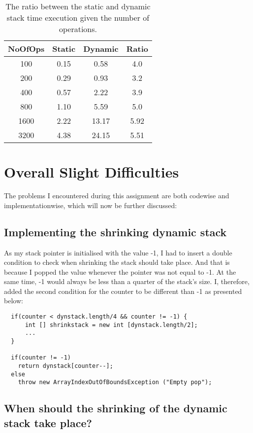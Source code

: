 \documentclass[a4paper,11pt]{article}
\begin{document}
  \begin{table}[h!]
    \centering
     \begin{tabular}{||c c c c||} 
     \hline
     NoOfOps & Static & Dynamic & Ratio \\ [0.5ex] 
     \hline\hline
     100 & 0.15 & 0.58 & 4.0 \\ 
     200 & 0.29 & 0.93 & 3.2 \\
     400 & 0.57 & 2.22 & 3.9 \\
     800 & 1.10 & 5.59 & 5.0 \\
     1600 & 2.22 & 13.17 & 5.92\\ 
     3200 & 4.38 & 24.15 & 5.51\\ [1ex] 
     \hline
     \end{tabular}
     \caption{The ratio between the static and dynamic stack time execution given the number of operations.}
     \label{table:1}
    \end{table}

\section*{Overall Slight Difficulties}

The problems I encountered during this assignment are both codewise and implementationwise, which will now be further discussed: 

\subsection* {Implementing the shrinking dynamic stack}
As my stack pointer is initialised with the value -1, I had to insert a double condition to check when shrinking the stack should take place.
And that is because I popped the value whenever the pointer was not equal to -1. At the same time, -1 would always be less than a quarter of the stack's size. 
I, therefore, 
added the second condition for the counter to be different than -1 as presented below: 

\begin{verbatim}
  if(counter < dynstack.length/4 && counter != -1) {
      int [] shrinkstack = new int [dynstack.length/2];
      ...
  }    

  if(counter != -1)
    return dynstack[counter--];
  else
    throw new ArrayIndexOutOfBoundsException ("Empty pop");  
 \end{verbatim}

 \subsection*{When should the shrinking of the dynamic stack take place?} 
\end{document}

